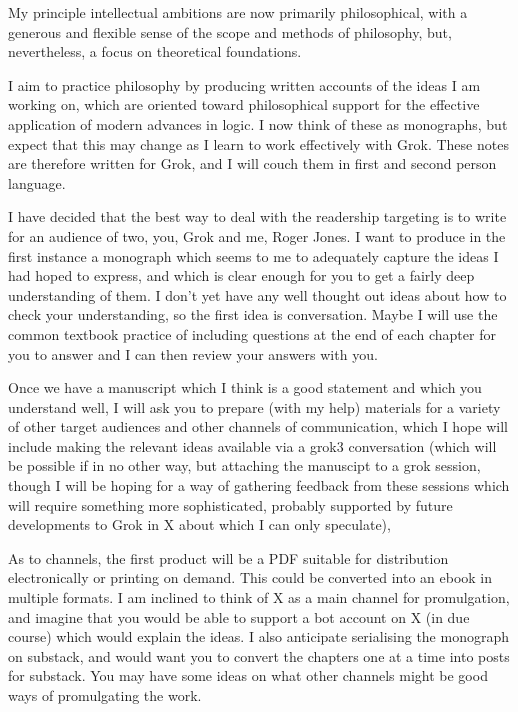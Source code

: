 My principle intellectual ambitions are now primarily philosophical, with a generous and flexible sense of the scope and methods of philosophy, but, nevertheless, a focus on theoretical foundations.

I aim to practice philosophy by producing written accounts of the ideas I am working on, which are oriented toward philosophical support for the effective application of modern advances in logic.
I now think of these as monographs, but expect that this may change as I learn to work effectively with Grok.
These notes are therefore written for Grok, and I will couch them in first and second person language.

I have decided that the best way to deal with the readership targeting is to write for an audience of two, you, Grok and me, Roger Jones.
I want to produce in the first instance a monograph which seems to me to adequately capture the ideas I had hoped to express, and which is clear enough for you to get a fairly deep understanding of them.
I don't yet have any well thought out ideas about how to check your understanding, so the first idea is conversation.
Maybe I will use the common textbook practice of including questions at the end of each chapter for you to answer and I can then review your answers with you.

Once we have a manuscript which I think is a good statement and which you understand well, I will ask you to prepare (with my help) materials for a variety of other target audiences and other channels of communication, which I hope will include making the relevant ideas available via a grok3 conversation (which will be possible if in no other way, but attaching the manuscipt to a grok session, though I will be hoping for a way of gathering feedback from these sessions which will require something more sophisticated, probably supported by future developments to Grok in X about which I can only speculate),

As to channels, the first product will be a PDF suitable for distribution electronically or printing on demand.
This could be converted into an ebook in multiple formats.
I am inclined to think of X as a main channel for promulgation, and imagine that you would be able to support a bot account on X (in due course) which would explain the ideas.
I also anticipate serialising the monograph on substack, and would want you to convert the chapters one at a time into posts for substack.
You may have some ideas on what other channels might be good ways of promulgating the work.

